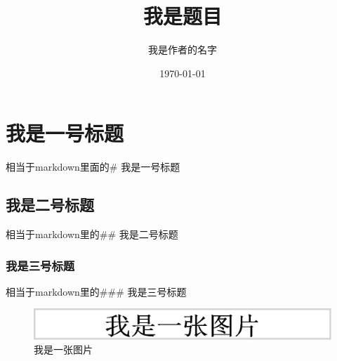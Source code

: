 \documentclass[UTF8]{ctexart}
\title{我是题目}
\author{我是作者的名字}
\date{\today}%
\begin{document}
\maketitle

\section{我是一号标题}
相当于markdown里面的\# 我是一号标题
\subsection{我是二号标题}
相当于markdown里的\#\# 我是二号标题
\subsubsection{我是三号标题}
相当于markdown里的\#\#\# 我是三号标题

\begin{figure}[H]%
\centering%
\includegraphics[width = .8\textwidth]{我是一张图片.png}%
\caption{我是一张图片}%
\label{fig:1}%
\end{figure}

\end{document}
